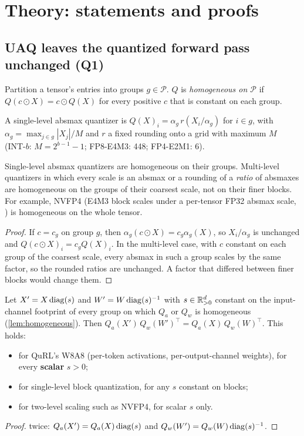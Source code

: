 \documentclass[11pt]{article}
\begin{document}
\section{Theory: statements and proofs}\label{sec:theory}

\subsection{UAQ leaves the quantized forward pass unchanged (Q1)}\label{sec:invariance}

\begin{definition}
Partition a tensor's entries into groups $g\in\mathcal P$. $Q$ is \emph{homogeneous on $\mathcal P$} if $Q(c\odot X)=c\odot Q(X)$ for every positive $c$ that is constant on each group.
\end{definition}

A single-level absmax quantizer is $Q(X)_i=\alpha_g\,r(X_i/\alpha_g)$ for $i\in g$, with $\alpha_g=\max_{j\in g}|X_j|/M$ and $r$ a fixed rounding onto a grid with maximum $M$ (INT-$b$: $M=2^{b-1}-1$; FP8-E4M3: 448; FP4-E2M1: 6).

\begin{lemma}\label{lem:homogeneous}
Single-level absmax quantizers are homogeneous on their groups. Multi-level quantizers in which every scale is an absmax or a rounding of a \emph{ratio} of absmaxes are homogeneous on the groups of their coarsest scale, not on their finer blocks. For example, NVFP4 (E4M3 block scales under a per-tensor FP32 absmax scale, \citealp{nvidia2025nvfp4}) is homogeneous on the whole tensor.
\end{lemma}
\begin{proof}
If $c=c_g$ on group $g$, then $\alpha_g(c\odot X)=c_g\alpha_g(X)$, so $X_i/\alpha_g$ is unchanged and $Q(c\odot X)_i=c_gQ(X)_i$. In the multi-level case, with $c$ constant on each group of the coarsest scale, every absmax in such a group scales by the same factor, so the rounded ratios are unchanged. A factor that differed between finer blocks would change them.
\end{proof}

\begin{theorem}\label{thm:invariance}
Let $X'=X\operatorname{diag}(s)$ and $W'=W\operatorname{diag}(s)^{-1}$ with $s\in\mathbb{R}^d_{>0}$ constant on the input-channel footprint of every group on which $Q_a$ or $Q_w$ is homogeneous (\cref{lem:homogeneous}). Then $Q_a(X')\,Q_w(W')^\top=Q_a(X)\,Q_w(W)^\top$. This holds:
\begin{itemize}
\item for QuRL's W8A8 (per-token activations, per-output-channel weights), for every \textbf{scalar} $s>0$;
\item for single-level block quantization, for any $s$ constant on blocks;
\item for two-level scaling such as NVFP4, for scalar $s$ only.
\end{itemize}
\end{theorem}
\begin{proof}
 twice: $Q_a(X')=Q_a(X)\operatorname{diag}(s)$ and $Q_w(W')=Q_w(W)\operatorname{diag}(s)^{-1}$.
\end{proof}
\end{document}
